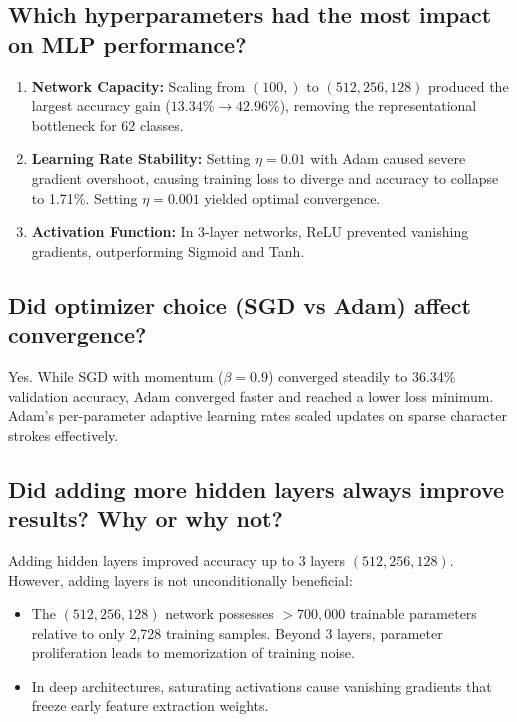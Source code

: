 \documentclass[12pt,a4paper]{article}
\begin{document}
\subsection{Which hyperparameters had the most impact on MLP performance?}
\begin{enumerate}
\item \textbf{Network Capacity:} Scaling from $(100,)$ to $(512, 256, 128)$ produced the largest accuracy gain ($13.34\% \to 42.96\%$), removing the representational bottleneck for 62 classes.
\item \textbf{Learning Rate Stability:} Setting $\eta=0.01$ with Adam caused severe gradient overshoot, causing training loss to diverge and accuracy to collapse to 1.71\%. Setting $\eta=0.001$ yielded optimal convergence.
\item \textbf{Activation Function:} In 3-layer networks, ReLU prevented vanishing gradients, outperforming Sigmoid and Tanh.
\end{enumerate}

\subsection{Did optimizer choice (SGD vs Adam) affect convergence?}
Yes. While SGD with momentum ($\beta=0.9$) converged steadily to 36.34\% validation accuracy, Adam converged faster and reached a lower loss minimum. Adam's per-parameter adaptive learning rates scaled updates on sparse character strokes effectively.

\subsection{Did adding more hidden layers always improve results? Why or why not?}
Adding hidden layers improved accuracy up to 3 layers $(512, 256, 128)$. However, adding layers is not unconditionally beneficial:
\begin{itemize}
\item The $(512, 256, 128)$ network possesses $>700,000$ trainable parameters relative to only 2,728 training samples. Beyond 3 layers, parameter proliferation leads to memorization of training noise.
\item In deep architectures, saturating activations cause vanishing gradients that freeze early feature extraction weights.
\end{itemize}
\end{document}
